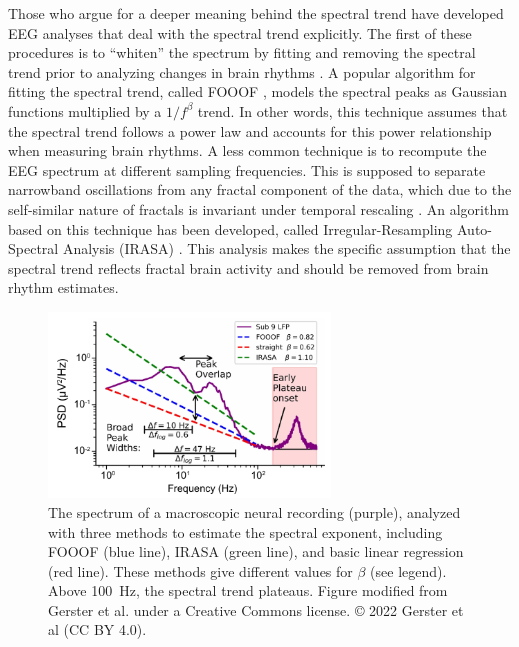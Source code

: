 Those who argue for a deeper meaning behind the spectral trend have developed EEG analyses that deal with the spectral trend explicitly. The first of these procedures is to ``whiten'' the spectrum by fitting and removing the spectral trend prior to analyzing changes in brain rhythms \cite{Buzsaki2004,Buzsaki2006,Donoghue2020}. A popular algorithm for fitting the spectral trend, called FOOOF \cite{Donoghue2020}, models the spectral peaks as Gaussian functions multiplied by a $1/f^\beta$ trend. In other words, this technique assumes that the spectral trend follows a power law and accounts for this power relationship when measuring brain rhythms. A less common technique is to recompute the EEG spectrum at different sampling frequencies. This is supposed to separate narrowband oscillations from any fractal component of the data, which due to the self-similar nature of fractals is invariant under temporal rescaling \cite{Yamamoto1993}. An algorithm based on this technique has been developed, called Irregular-Resampling Auto-Spectral Analysis (IRASA) \cite{Wen2016}. This analysis makes the specific assumption that the spectral trend reflects fractal brain activity and should be removed from brain rhythm estimates.

\begin{figure}
\vspace{-15pt}
\includegraphics[width=75mm]{Figures/chapter1/gerster.pdf}
\vspace{-10pt}
\caption{  The spectrum of a macroscopic neural recording (purple), analyzed with three methods to estimate the spectral exponent, including FOOOF (blue line), IRASA (green line), and basic linear regression (red line). These methods give different values for $\beta$ (see legend). Above \qty{100}{\hertz}, the spectral trend plateaus. Figure modified from Gerster et al. \cite{Gerster2022} under a Creative Commons license. © 2022 Gerster et al (CC BY 4.0).
} \label{fig:gerster}
\end{figure}

